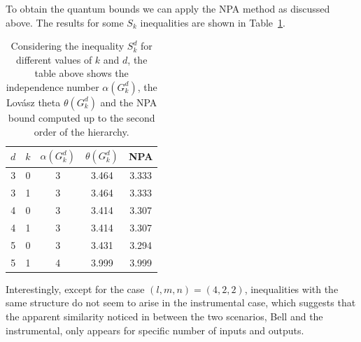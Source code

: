 \documentclass[letterpaper]{article}
\begin{document}
To obtain the quantum bounds we can apply the NPA method as discussed above.
The results for some $S_k$ inequalities are shown in Table~\ref{tab:gclmps}.
\begin{table}
    \centering
    \begin{tabular}{ccccc}
        $d$ & $k$ & $\alpha(G^d_k)$ & $\theta(G^d_k)$ & NPA \\
        \toprule
         3 & 0 & 3 & 3.464 & 3.333 \\
         3 & 1 & 3 & 3.464 & 3.333 \\
        \midrule
         4 & 0 & 3 & 3.414 & 3.307 \\
         4 & 1 & 3 & 3.414 & 3.307 \\
        \midrule
         5 & 0 & 3 & 3.431 & 3.294 \\
         5 & 1 & 4 & 3.999 & 3.999 \\
        \bottomrule
    \end{tabular}
    \caption{Considering the inequality $S^d_k$ for different values of $k$ and $d$, the table above shows the independence number $\alpha(G^d_k)$, the Lov\'asz theta $\theta(G^d_k)$ and the NPA bound computed up to the second order of the hierarchy.}
    \label{tab:gclmps}
\end{table}
        
Interestingly, except for the case $(l,m,n) = (4,2,2)$, inequalities with the
same structure do not seem to arise in the instrumental case, which suggests
that the apparent similarity noticed in \cite{himbeeck2018} between the two scenarios, Bell and the
instrumental, only appears for specific number of inputs and outputs. 
\end{document}
